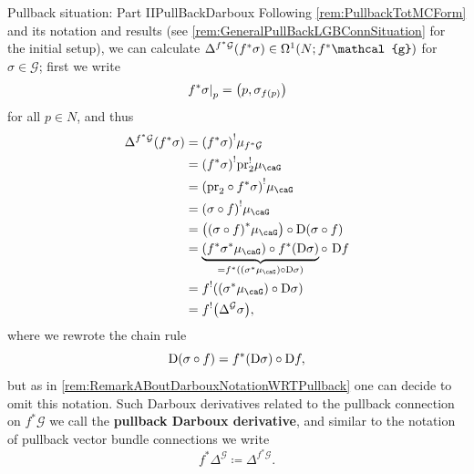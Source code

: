 \documentclass[reqno,a4paper,oneside]{amsart}
\newcommand\mutot{\mu_\caG}
\theoremstyle{plain}
\theoremstyle{remark}
\theoremstyle{definition}
\def\bas#1\eas{\begin{align*}#1\end{align*}}
\begin{document}
\begin{remarks}{Pullback situation: Part II}{PullBackDarboux}
Following \ref{rem:PullbackTotMCForm} and its notation and results (see \ref{rem:GeneralPullBackLGBConnSituation} for the initial setup), we can calculate $\Delta^{f^*\mathcal{G}}\mleft( f^*\sigma \mright) \in \Omega^1(N; f^*\mathcal{g})$ for $\sigma \in \mathcal{G}$; first we write
\begin{equation*}
\mleft.f^*\sigma\mright|_p
=
\mleft( p, \sigma_{f(p)} \mright)
\end{equation*}
for all $p \in N$, and thus
\begin{align}\label{PullBackDarbouxOnPullbackSections}
\Delta^{f^*\mathcal{G}}\mleft( f^*\sigma \mright)
&=
\mleft( f^*\sigma \mright)^! \mu_{f^*\mathcal{G}}
\nonumber
\\
&=
\mleft( f^*\sigma \mright)^! \mathrm{pr}_2^! \mutot
\nonumber
\\
&=
\mleft( \mathrm{pr}_2\circ f^*\sigma \mright)^! \mutot
\nonumber
\\
&=
\mleft( \sigma \circ f \mright)^!\mutot
\nonumber
\\
&=
\mleft(\mleft( \sigma \circ f \mright)^*\mutot \mright)
	\circ \mathrm{D}(\sigma\circ f)
\nonumber
\\
&=
\underbrace{\mleft( f^* \sigma^*\mutot \mright) \circ f^*\mleft(\mathrm{D}\sigma\mright)}_{= f^*\mleft( \mleft(\sigma^*\mutot \mright) \circ \mathrm{D}\sigma \mright)} \circ ~\mathrm{D}f
\nonumber
\\
&=
f^!\mleft(\mleft( \sigma^*\mutot \mright) \circ \mathrm{D}\sigma\mright)
\nonumber
\\
&=
f^!\mleft( \Delta^{\mathcal{G}} \sigma \mright),
\end{align}
where we rewrote the chain rule
\begin{equation*}
\mathrm{D}(\sigma \circ f)
=
f^*\mleft(\mathrm{D}\sigma\mright) \circ \mathrm{D}f,
\end{equation*}
but as in \ref{rem:RemarkABoutDarbouxNotationWRTPullback} one can decide to omit this notation. Such Darboux derivatives related to the pullback connection on $f^*\mathcal{G}$ we call the \textbf{pullback Darboux derivative}, and similar to the notation of pullback vector bundle connections we write
\begin{equation*}
f^*\Delta^{\mathcal{G}}
\coloneqq
\Delta^{f^*\mathcal{G}}.
\end{equation*}
\end{remarks}
\end{document}
